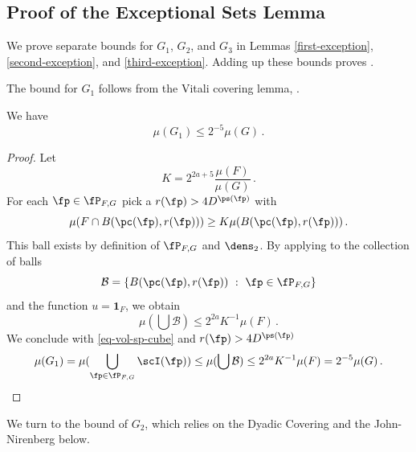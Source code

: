 \subsection{Proof of the Exceptional Sets Lemma}
\label{subsetexcset}


We prove separate bounds for $G_1$, $G_2$, and $G_3$
in Lemmas \ref{first-exception},
\ref{second-exception}, and \ref{third-exception}. Adding up these bounds proves .

The bound for $G_1$ follows from the Vitali covering lemma, .

\begin{lemma}
    \label{first-exception}
    \leanok
    We have
    \begin{equation}
        \mu(G_1)\le 2^{-5}\mu(G)\, .
    \end{equation}
\end{lemma}
\begin{proof}
    \leanok
    Let
    $$
        K = 2^{2a+5}\frac{\mu(F)}{\mu(G)}\,.
    $$
    For each $\fp\in \fP_{F,G}$ pick a
    $r(\fp)>4D^{\ps(\fp)}$ with
    $$
    {\mu(F\cap B(\pc(\fp),r(\fp)))}\ge K{\mu(B(\pc(\fp),r(\fp)))}\, .
    $$
    This ball exists by definition of $\fP_{F,G}$
    and $\dens_2$. By applying  to the collection of balls
    $$
        \mathcal{B} = \{B(\pc(\fp),r(\fp)) \ : \ \fp \in \fP_{F,G}\}
    $$
    and the function $u = \mathbf{1}_F$, we obtain
    $$
        \mu(\bigcup \mathcal{B}) \le 2^{2a} K^{-1} \mu(F)\,.
    $$
    We conclude with \eqref{eq-vol-sp-cube} and $r(\fp)>4D^{\ps(\fp)}$
    $$
        \mu(G_1)= \mu(\bigcup_{\fp\in \fP_{F,G}} \scI(\fp))
        \le \mu(\bigcup \mathcal{B})\le 2^{2a} K^{-1} \mu (F) = 2^{-5}\mu(G)\,.
    $$
\end{proof}


We turn to the bound of $G_2$, which relies on the Dyadic Covering  and the
John-Nirenberg  below.

